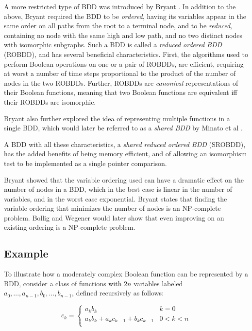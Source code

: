 \documentclass[a4paper,11pt]{kth-mag}
\newcommand{\AND}{}
\newcommand{\IOR}{+}
\begin{document}
A more restricted type of BDD was introduced by Bryant \cite{bryant86}.
In addition to the above, Bryant required the BDD to be \emph{ordered}, having its variables appear in the same order on all paths from the root to a terminal node,
and to be \emph{reduced}, containing no node with the same high and low path, and no two distinct nodes with isomorphic subgraphs.
Such a BDD is called a \emph{reduced ordered BDD} (ROBDD), and has several beneficial characteristics.
First, the algorithms used to perform Boolean operations on one or a pair of ROBDDs, are efficient, requiring at worst a number of time steps proportional to the product of the number of nodes in the two ROBDDs.
Further, ROBDDs are \emph{canonical} representations of their Boolean functions, meaning that two Boolean functions are equivalent iff their ROBDDs are isomorphic.

Bryant also further explored the idea of representing multiple functions in a single BDD, which would later be referred to as a \emph{shared BDD} by Minato et al \cite{minato90}.

A BDD with all these characteristics, a \emph{shared reduced ordered BDD} (SROBDD), has the added benefits of being memory efficient, and of allowing an isomorphism test to be implemented as a single pointer comparison.

Bryant showed that the variable ordering used can have a dramatic effect on the number of nodes in a BDD, which in the best case is linear in the number of variables, and in the worst case exponential.
Bryant states that finding the variable ordering that minimizes the number of nodes is an NP-complete problem.
Bollig and Wegener \cite{bollig96} would later show that even improving on an existing ordering is a NP-complete problem.


\subsection{Example}

To illustrate how a moderately complex Boolean function can be represented by a BDD, consider a class of functions with $2n$ variables labeled $a_0,...,a_{n-1},b_0,...,b_{n-1}$, defined recursively as follows:

$$
  c_k = \left\{
  \begin{array}{ll}
    a_k \AND b_k                                             & k = 0 \\
    a_k \AND b_k \IOR a_k \AND c_{k-1} \IOR b_k \AND c_{k-1} & 0 < k < n \\
  \end{array}\right.
$$
\end{document}
